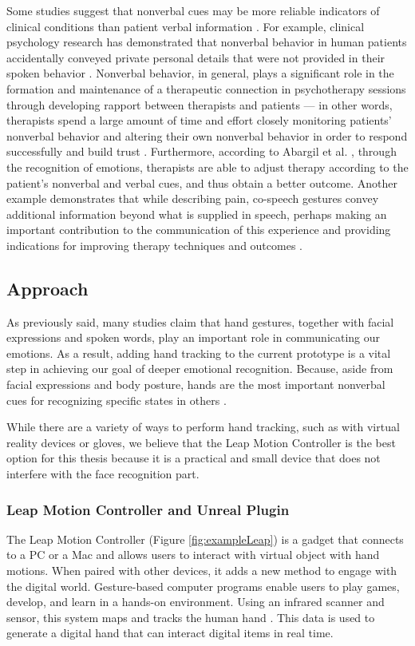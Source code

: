 Some studies suggest that nonverbal cues may be more reliable indicators of clinical conditions than patient verbal information \cite{KNA13}. For example, clinical psychology research has demonstrated that nonverbal behavior in human patients accidentally conveyed private personal details that were not provided in their spoken behavior \cite{FAB06, KLE03}. Nonverbal behavior, in general, plays a significant role in the formation and maintenance of a therapeutic connection in psychotherapy sessions through developing rapport between therapists and patients \cite{KLE03} — in other words, therapists spend a large amount of time and effort closely monitoring patients' nonverbal behavior and altering their own nonverbal behavior in order to respond successfully and build trust \cite{ABA21}. Furthermore, according to Abargil et al. \cite{ABA21}, through the recognition of emotions, therapists are able to adjust therapy according to the patient's nonverbal and verbal cues, and thus obtain a better outcome. Another example demonstrates that while describing pain, co-speech gestures convey additional information beyond what is supplied in speech, perhaps making an important contribution to the communication of this experience and providing indications for improving therapy techniques and outcomes \cite{ROW16, REI22}.

\subsection{Approach}
As previously said, many studies claim that hand gestures, together with facial expressions and spoken words, play an important role in communicating our emotions. As a result, adding hand tracking to the current prototype is a vital step in achieving our goal of deeper emotional recognition. Because, aside from facial expressions and body posture, hands are the most important nonverbal cues for recognizing specific states in others \cite{WAX97, REI22}.

While there are a variety of ways to perform hand tracking, such as with virtual reality devices or gloves, we believe that the Leap Motion Controller is the best option for this thesis because it is a practical and small device that does not interfere with the face recognition part.

\subsubsection{Leap Motion Controller and Unreal Plugin}
The Leap Motion Controller (Figure \ref{fig:exampleLeap}) is a gadget that connects to a PC or a Mac and allows users to interact with virtual object with hand motions. When paired with other devices, it adds a new method to engage with the digital world. Gesture-based computer programs enable users to play games, develop, and learn in a hands-on environment. Using an infrared scanner and sensor, this system maps and tracks the human hand \cite{LEAPROD}. This data is used to generate a digital hand that can interact digital items in real time.

